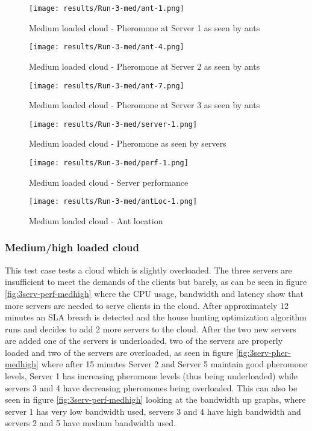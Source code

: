 \begin{figure}[!ht]
	\centering
		\texttt{[image: results/Run-3-med/ant-1.png]}
	\caption{Medium loaded cloud - Pheromone at Server 1 as seen by ants}
	\label{fig:3serv-ant1-med}
\end{figure}

\begin{figure}
	\centering
		\texttt{[image: results/Run-3-med/ant-4.png]}
	\caption{Medium loaded cloud - Pheromone at Server 2 as seen by ants}
	\label{fig:3serv-ant4-med}
\end{figure}

\begin{figure}
	\centering
		\texttt{[image: results/Run-3-med/ant-7.png]}
	\caption{Medium loaded cloud - Pheromone at Server 3 as seen by ants}
	\label{fig:3serv-ant7-med}
\end{figure}

\begin{figure}
	\centering
		\texttt{[image: results/Run-3-med/server-1.png]}
	\caption{Medium loaded cloud - Pheromone as seen by servers}
	\label{fig:3serv-pher-med}
\end{figure}

\begin{figure}
	\centering
		\texttt{[image: results/Run-3-med/perf-1.png]}
	\caption{Medium loaded cloud - Server performance}
	\label{fig:3serv-perf-med}
\end{figure}

\begin{figure}
	\centering
		\texttt{[image: results/Run-3-med/antLoc-1.png]}
	\caption{Medium loaded cloud - Ant location}
	\label{fig:3serv-antloc-med}
\end{figure}

\subsubsection{Medium/high loaded cloud}

This test case tests a cloud which is slightly overloaded. The three servers are insufficient to meet the demands of the clients but barely, as can be seen in figure \ref{fig:3serv-perf-medhigh} where the CPU usage, bandwidth and latency show that more servers are needed to serve clients in the cloud. After approximately 12 minutes an SLA breach is detected and the house hunting optimization algorithm runs and decides to add 2 more servers to the cloud. After the two new servers are added one of the servers is underloaded, two of the servers are properly loaded and two of the servers are overloaded, as seen in figure \ref{fig:3serv-pher-medhigh} where after 15 minutes Server 2 and Server 5 maintain good pheromone levels, Server 1 has increasing pheromone levels (thus being underloaded) while servers 3 and 4 have decreasing pheromones being overloaded. This can also be seen in figure \ref{fig:3serv-perf-medhigh} looking at the bandwidth up graphs, where server 1 has very low bandwidth used, servers 3 and 4 have high bandwidth and servers 2 and 5 have medium bandwidth used.

